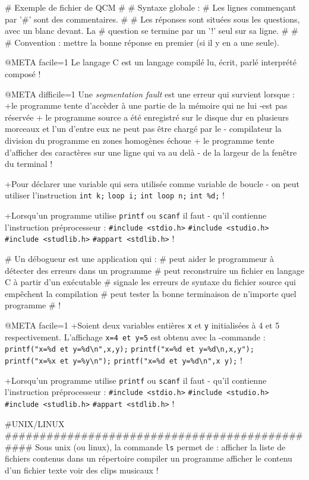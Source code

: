 # Exemple de fichier de QCM
#
# Syntaxe globale :
# Les lignes commençant par '#' sont des commentaires.
#
# Les réponses sont situées sous les questions, avec un blanc devant. La
# question se termine par un '!' seul sur sa ligne.
#
#
# Convention : mettre la bonne réponse en premier (si il y en a une seule).

@META facile=1
Le langage C est un langage
 compilé
 lu, écrit, parlé
 interprété
 composé
!

@META difficile=1
Une \emph{segmentation fault} est une erreur qui survient lorsque :
+le programme tente d'accèder à une partie de la mémoire qui ne lui
-est pas réservée
+ le programme source a été enregistré sur le disque dur en plusieurs
  morceaux et l'un d'entre eux ne peut pas être chargé par le
- compilateur
 la division du programme en zones homogènes échoue
+ le programme tente d'afficher des caractères sur une ligne qui va au delà
- de la largeur de la fenêtre du terminal
!

+Pour déclarer une variable qui sera utilisée comme variable de boucle
- on peut utiliser l'instruction
  \verb|int k;|
  \verb|loop i;|
  \verb|int loop n;|
  \verb|int %d;|
!

+Lorsqu'un programme utilise \verb|printf| ou \verb|scanf| il faut
- qu'il contienne l'instruction préprocesseur :
 \verb|#include <stdio.h>|
 \verb|#include <studio.h>|
 \verb|#include <studlib.h>|
 \verb|#appart <stdlib.h>|
!



# Un débogueur est une application qui :
#  peut aider le programmeur à détecter des erreurs dans un programme
#  peut reconstruire un fichier en langage C à partir d'un exécutable
#  signale les erreurs de syntaxe du fichier source qui empêchent la compilation 
#  peut tester la bonne terminaison de n'importe quel programme
# !

@META facile=1
+Soient deux variables entières \verb|x| et \verb|y| initialisées à
4 et 5 respectivement. L'affichage \verb|x=4 et y=5| est obtenu avec la
-commande :
 \verb|printf("x=%d et y=%d\n",x,y);|
 \verb|printf("x=%d et y=%d\n,x,y");|
 \verb|printf("x=%x et y=%y\n");|
 \verb|printf("x=%d et y=%d\n",x y);|
!

+Lorsqu'un programme utilise \verb|printf| ou \verb|scanf| il faut
- qu'il contienne l'instruction préprocesseur :
 \verb|#include <stdio.h>|
 \verb|#include <studio.h>|
 \verb|#include <studlib.h>|
 \verb|#appart <stdlib.h>|
!


#UNIX/LINUX ###############################################
Sous unix (ou linux), la commande \verb|ls| permet de :
 afficher la liste de fichiers contenus dans un répertoire
 compiler un programme
 afficher le contenu d'un fichier texte
 voir des clips musicaux
!

